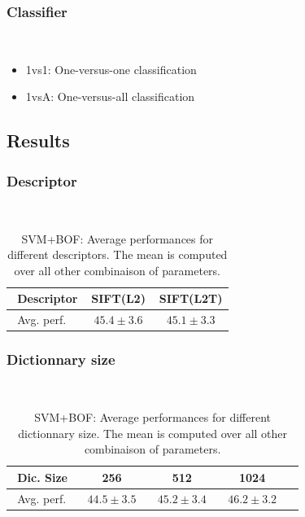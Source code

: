 \documentclass[10pt,a4paper]{llncs}
\begin{document}
\subsubsection{Classifier}$~$\\
\begin{itemize}
\item 1vs1: One-versus-one classification
\item 1vsA: One-versus-all classification
\end{itemize}

\subsection{Results}

\subsubsection{Descriptor}$~$\\

\begin{table}[H]
\centering
\caption{SVM+BOF: Average performances for different descriptors. The mean is computed over all other combinaison of parameters.}
\label{table:SVM_BOF:Descriptor}
\begin{tabular}{|l|c|c|}
\hline
$~~$Descriptor & SIFT(L2) & SIFT(L2T) \\ \hline
$~~$Avg. perf.$~~$ & $~~\mathbf{45.4 \pm 3.6}~~$ & $~~45.1 \pm 3.3~~$ \\ \hline
\end{tabular}
\end{table}

\subsubsection{Dictionnary size}$~$\\

\begin{table}[H]
\centering
\caption{SVM+BOF: Average performances for different dictionnary size. The mean is computed over all other combinaison of parameters.}
\label{table:SVM_BOF:DicSize}
\begin{tabular}{|l|c|c|c|c|}
\hline
$~~$Dic. Size & 256 & 512 & 1024 \\ \hline
$~~$Avg. perf.$~~$ & $~~44.5 \pm 3.5~~$ & $~~45.2 \pm 3.4~~$ & $~~\mathbf{46.2 \pm 3.2}~~$ \\ \hline
\end{tabular}
\end{table}
\end{document}
